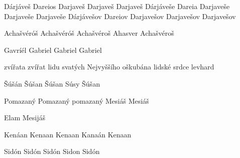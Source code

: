   {Dárjáveš}   {Dareios} {Darjaveš}   {Darjaveš}   {Darjaveš}
   {Dárjáveše}  {Dareia}  {Darjaveše}  {Darjaveše}  {Darjaveše}
  {Dárjávešov} {Dareiov} {Darjavešov} {Darjavešov} {Darjavešov}

 {Achašvéróš} {Achašvéróš} {Achašvéroš} {Ahasver} {Achašvéroš}

 {Gavríél} {Gabriel} {Gabriel} {Gabriel} {}

 {} {} {zvířata} {} {} %
  {} {} {zvířat}  {} {} %
  {} {} {lidu svatých Nejvyššího}  {} {} %
  {} {} {oškubána}  {} {} %
  {} {} {lidské srdce}  {} {} %
  {} {} {levhard}  {} {}

 {Šúšán} {Šúšan} {Šúšan} {Súsy} {Šúšan} %

 {Pomazaný} {Pomazaný} {pomazaný} {Mesiáš} {Mesiáš}

  {} {}  {Elam}    {} {} %
 {} {} {Mesijáš} {} {}

        {Kenáan}  %
        {Kenaan}  %
        {Kenaan}  %
        {Kanaán}  %
        {Kenaan}  %

 {Sidón} {Sidón} {Sidón} {Sidon} {Sidón}

\endinput

